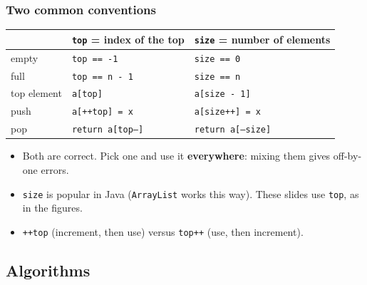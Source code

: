 \documentclass[aspectratio=169,10pt,compress]{beamer}
\begin{document}
\begin{frame}[t,fragile] \frametitle{Two common conventions}
  \begin{center}\small
  \begin{tabular}{lll}
    \toprule
                            & \texttt{top} = index of the top     & \texttt{size} = number of elements \\
    \midrule
    empty                   & \texttt{top == -1}                  & \texttt{size == 0} \\
    full                    & \texttt{top == n - 1}               & \texttt{size == n} \\
    top element             & \texttt{a[top]}                     & \texttt{a[size - 1]} \\
    push                    & \texttt{a[++top] = x}               & \texttt{a[size++] = x} \\
    pop                     & \texttt{return a[top--]}            & \texttt{return a[--size]} \\
    \bottomrule
  \end{tabular}
  \end{center}
  \vspace{0.4em}
  \begin{itemize}\small
    \item Both are correct. Pick one and use it \textbf{everywhere}: mixing them gives off-by-one errors.
    \item \texttt{size} is popular in Java (\texttt{ArrayList} works this way). These slides use \texttt{top}, as in the figures.
    \item {} \texttt{++top} (increment, then use) versus \texttt{top++} (use, then increment).
  \end{itemize}
\end{frame}

\subsection[Algorithms]{Algorithms}
\end{document}
